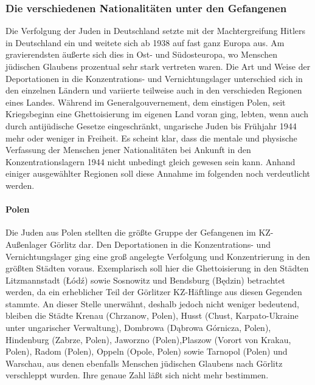 \documentclass[a4paper,12pt,ngerman,
]{nisebook}
\begin{document}
\subsubsection{Die verschiedenen Nationalitäten unter den Gefangenen}
Die Verfolgung der Juden in Deutschland setzte mit der Machtergreifung Hitlers in Deutschland ein und weitete sich ab 1938 auf fast ganz Europa aus. Am gravierendsten äußerte sich dies in Ost- und Südosteuropa, wo Menschen jüdischen Glaubens prozentual sehr stark vertreten waren. Die Art und Weise der Deportationen in die Konzentrations- und Vernichtungslager unterschied sich in den einzelnen Ländern und variierte teilweise auch in den verschieden Regionen eines Landes.
Während im Generalgouvernement, dem einstigen Polen, seit Kriegsbeginn eine Ghettoisierung im eigenen Land voran ging, lebten, wenn auch durch antijüdische Gesetze eingeschränkt, ungarische Juden bis Frühjahr 1944 mehr oder weniger in Freiheit.
Es scheint klar, dass die mentale und physische Verfassung der Menschen jener Nationalitäten bei Ankunft in den Konzentrationslagern 1944 nicht unbedingt gleich gewesen sein kann. Anhand einiger ausgewählter Regionen soll diese Annahme im folgenden noch verdeutlicht werden.





\paragraph{Polen}
Die Juden aus Polen stellten die größte Gruppe der Gefangenen im KZ-Außenlager Görlitz dar. Den Deportationen in die Konzentrations- und Vernichtungslager ging eine groß angelegte Verfolgung und Konzentrierung in den größten Städten voraus. Exemplarisch soll hier die Ghettoisierung in den Städten Litzmannstadt (\L \'od\'z) sowie Sosnowitz und Bendsburg (Będzin) betrachtet werden, da ein erheblicher Teil der Görlitzer KZ-Häftlinge aus diesen Gegenden stammte. An dieser Stelle unerwähnt, deshalb jedoch nicht weniger bedeutend, bleiben die Städte Krenau (Chrzanow, Polen), Husst (Chust, Karpato-Ukraine unter ungarischer Verwaltung), Dombrowa (Dąbrowa Górnicza, Polen), Hindenburg (Zabrze, Polen), Jaworzno (Polen),Plaszow (Vorort von Krakau, Polen), Radom (Polen), Oppeln (Opole, Polen) sowie Tarnopol (Polen) und Warschau, aus denen ebenfalls Menschen jüdischen Glaubens nach Görlitz verschleppt wurden. Ihre genaue Zahl läßt sich nicht mehr bestimmen.
\end{document}
